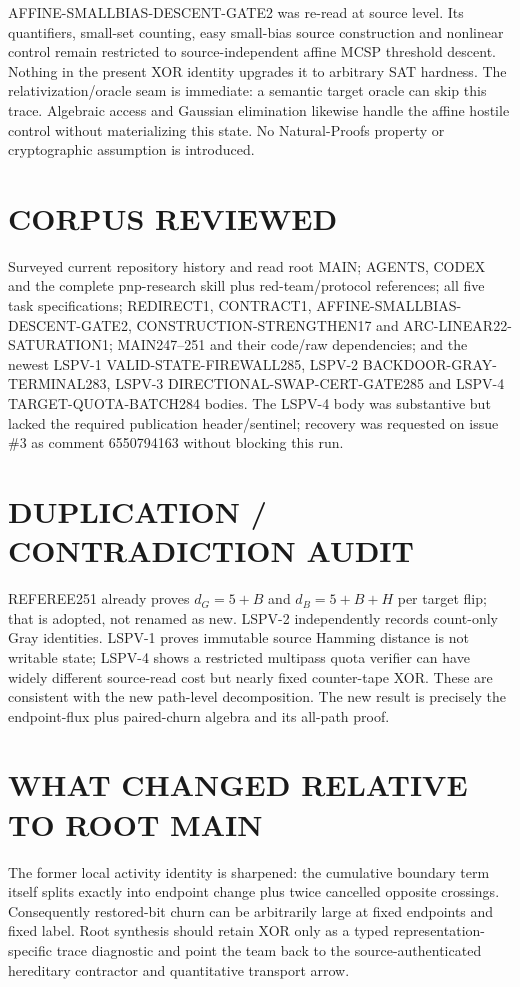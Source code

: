 \documentclass[11pt]{article}
\begin{document}
AFFINE-SMALLBIAS-DESCENT-GATE2 was re-read at source level.  Its quantifiers,
small-set counting, easy small-bias source construction and nonlinear control
remain restricted to source-independent affine MCSP threshold descent.  Nothing
in the present XOR identity upgrades it to arbitrary SAT hardness.  The
relativization/oracle seam is immediate: a semantic target oracle can skip this
trace.  Algebraic access and Gaussian elimination likewise handle the affine
hostile control without materializing this state.  No Natural-Proofs property
or cryptographic assumption is introduced.

\section{CORPUS REVIEWED}
Surveyed current repository history and read root MAIN; AGENTS, CODEX and the
complete pnp-research skill plus red-team/protocol references; all five task
specifications; REDIRECT1, CONTRACT1, AFFINE-SMALLBIAS-DESCENT-GATE2,
CONSTRUCTION-STRENGTHEN17 and ARC-LINEAR22-SATURATION1; MAIN247--251 and their
code/raw dependencies; and the newest LSPV-1 VALID-STATE-FIREWALL285, LSPV-2
BACKDOOR-GRAY-TERMINAL283, LSPV-3 DIRECTIONAL-SWAP-CERT-GATE285 and LSPV-4
TARGET-QUOTA-BATCH284 bodies.  The LSPV-4 body was substantive but lacked the
required publication header/sentinel; recovery was requested on issue \#3 as
comment 6550794163 without blocking this run.

\section{DUPLICATION / CONTRADICTION AUDIT}
REFEREE251 already proves $d_G=5+B$ and $d_B=5+B+H$ per target flip; that is
adopted, not renamed as new.  LSPV-2 independently records count-only Gray
identities.  LSPV-1 proves immutable source Hamming distance is not writable
state; LSPV-4 shows a restricted multipass quota verifier can have widely
different source-read cost but nearly fixed counter-tape XOR.  These are
consistent with the new path-level decomposition.  The new result is precisely
the endpoint-flux plus paired-churn algebra and its all-path proof.

\section{WHAT CHANGED RELATIVE TO ROOT MAIN}
The former local activity identity is sharpened: the cumulative boundary term
itself splits exactly into endpoint change plus twice cancelled opposite
crossings.  Consequently restored-bit churn can be arbitrarily large at fixed
endpoints and fixed label.  Root synthesis should retain XOR only as a typed
representation-specific trace diagnostic and point the team back to the
source-authenticated hereditary contractor and quantitative transport arrow.
\end{document}
